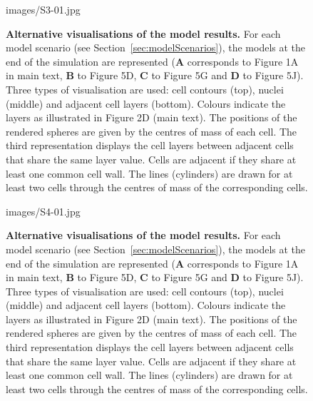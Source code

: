 %
\clearpage
%
\begin{figure}[htbp]
\centering
	\begin{overpic}[width=0.8\linewidth]{images/S3-01.jpg}
	\end{overpic}
\caption[Alternative visualisations of the model results.]
{{\bf Alternative visualisations of the model results.} For each model scenario (see Section~\ref{sec:modelScenarios}), the models at the end of the simulation are represented (\textbf{A} corresponds to Figure 1A in main text, \textbf{B} to Figure 5D, \textbf{C} to Figure 5G and \textbf{D} to Figure 5J). Three types of visualisation are used: cell contours (top), nuclei (middle) and adjacent cell layers (bottom). Colours indicate the layers as illustrated in Figure 2D (main text). The positions of the rendered spheres are given by the centres of mass of each cell. The third representation displays the cell layers between adjacent cells that share the same layer value. Cells are adjacent if they share at least one common cell wall. The lines (cylinders) are drawn for at least two cells through the centres of mass of the corresponding cells.
}
\label{fig:S3}
\end{figure}
%
\clearpage
%
\begin{figure}[htbp]
\centering
	\begin{overpic}[width=0.8\linewidth]{images/S4-01.jpg}
	\end{overpic}
\caption[Alternative visualisations of the model results.]
{{\bf Alternative visualisations of the model results.} For each model scenario (see Section~\ref{sec:modelScenarios}), the models at the end of the simulation are represented (\textbf{A} corresponds to Figure 1A in main text, \textbf{B} to Figure 5D, \textbf{C} to Figure 5G and \textbf{D} to Figure 5J). Three types of visualisation are used: cell contours (top), nuclei (middle) and adjacent cell layers (bottom). Colours indicate the layers as illustrated in Figure 2D (main text). The positions of the rendered spheres are given by the centres of mass of each cell. The third representation displays the cell layers between adjacent cells that share the same layer value. Cells are adjacent if they share at least one common cell wall. The lines (cylinders) are drawn for at least two cells through the centres of mass of the corresponding cells.
}
\label{fig:S4}
\end{figure}
%
\clearpage
%
